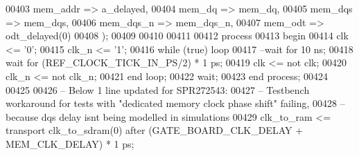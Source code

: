 \begin{DoxyCode}
00403                             mem_addr        => a_delayed,                           
00404                             mem_dq          => mem_dq,
00405                             mem_dqs         => mem_dqs,                                              
00406                             mem_dqs_n       => mem_dqs_n,
00407                             mem_odt         => odt_delayed\textcolor{vhdlchar}{(}\textcolor{vhdllogic}{0}\textcolor{vhdlchar}{)}
00408                         \textcolor{vhdlchar}{)};
00409             
00410 
00411 
00412     \textcolor{keywordflow}{process}
00413     \textcolor{keywordflow}{begin}
00414        \textcolor{vhdlchar}{clk} \textcolor{vhdlchar}{<=} \textcolor{vhdlchar}{'}\textcolor{vhdllogic}{}\textcolor{vhdllogic}{0}\textcolor{vhdlchar}{'};
00415        \textcolor{vhdlchar}{clk_n} \textcolor{vhdlchar}{<=} \textcolor{vhdlchar}{'}\textcolor{vhdllogic}{}\textcolor{vhdllogic}{1}\textcolor{vhdlchar}{'};
00416        \textcolor{keywordflow}{while} \textcolor{vhdlchar}{(}\textcolor{vhdlchar}{true}\textcolor{vhdlchar}{)} \textcolor{keywordflow}{loop}
00417 \textcolor{keyword}{           --wait for 10 ns;}
00418            \textcolor{keywordflow}{wait} \textcolor{keywordflow}{for} \textcolor{vhdlchar}{(}\textcolor{vhdlchar}{REF_CLOCK_TICK_IN_PS}\textcolor{vhdlchar}{/}\textcolor{vhdllogic}{}\textcolor{vhdllogic}{2}\textcolor{vhdlchar}{)} \textcolor{vhdlchar}{*} \textcolor{vhdllogic}{}\textcolor{vhdllogic}{1} \textcolor{vhdlchar}{ps};
00419            \textcolor{vhdlchar}{clk} \textcolor{vhdlchar}{<=} \textcolor{keywordflow}{not} \textcolor{vhdlchar}{clk};
00420            \textcolor{vhdlchar}{clk_n} \textcolor{vhdlchar}{<=} \textcolor{keywordflow}{not} \textcolor{vhdlchar}{clk_n};
00421        \textcolor{keywordflow}{end} \textcolor{keywordflow}{loop};
00422        \textcolor{keywordflow}{wait};
00423     \textcolor{keywordflow}{end} \textcolor{keywordflow}{process};
00424 
00425 
00426 \textcolor{keyword}{    -- Below 1 line updated for SPR272543: }
00427 \textcolor{keyword}{    -- Testbench workaround for tests with "dedicated memory clock phase shift" failing, }
00428 \textcolor{keyword}{    -- because dqs delay isnt being modelled in simulations}
00429     \textcolor{vhdlchar}{clk_to_ram}      \textcolor{vhdlchar}{<=} \textcolor{keywordflow}{transport} \textcolor{vhdlchar}{clk_to_sdram}\textcolor{vhdlchar}{(}\textcolor{vhdllogic}{}\textcolor{vhdllogic}{0}\textcolor{vhdlchar}{)}   \textcolor{keywordflow}{after} \textcolor{vhdlchar}{(}\textcolor{vhdlchar}{GATE_BOARD_CLK_DELAY} \textcolor{vhdlchar}{+} \textcolor{vhdlchar}{
      MEM_CLK_DELAY}\textcolor{vhdlchar}{)} \textcolor{vhdlchar}{*} \textcolor{vhdllogic}{}\textcolor{vhdllogic}{1} \textcolor{vhdlchar}{ps};

\end{DoxyCode}
